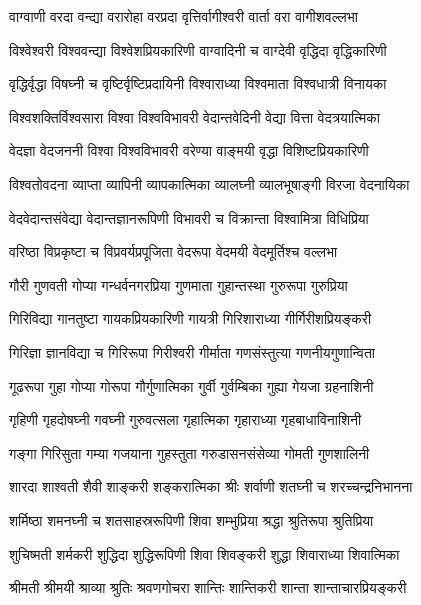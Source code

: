  \resetShloka


\twolineshloka
{वाग्वाणी वरदा वन्द्या वरारोहा वरप्रदा}
{वृत्तिर्वागीश्वरी वार्ता वरा वागीशवल्लभा}%

\twolineshloka
{विश्वेश्वरी विश्ववन्द्या विश्वेशप्रियकारिणी}
{वाग्वादिनी च वाग्देवी वृद्धिदा वृद्धिकारिणी}%

\twolineshloka
{वृद्धिर्वृद्धा विषघ्नी च वृष्टिर्वृष्टिप्रदायिनी}
{विश्वाराध्या विश्वमाता विश्वधात्री विनायका}%

\twolineshloka
{विश्वशक्तिर्विश्वसारा विश्वा विश्वविभावरी}
{वेदान्तवेदिनी वेद्या वित्ता वेदत्रयात्मिका}%

\twolineshloka
{वेदज्ञा वेदजननी विश्वा विश्वविभावरी}
{वरेण्या वाङ्मयी वृद्धा विशिष्टप्रियकारिणी}%

\twolineshloka
{विश्वतोवदना व्याप्ता व्यापिनी व्यापकात्मिका}
{व्यालघ्नी व्यालभूषाङ्गी विरजा वेदनायिका}%

\twolineshloka
{वेदवेदान्तसंवेद्या वेदान्तज्ञानरूपिणी}
{विभावरी च विक्रान्ता विश्वामित्रा विधिप्रिया}%

\twolineshloka
{वरिष्ठा विप्रकृष्टा च विप्रवर्यप्रपूजिता}
{वेदरूपा वेदमयी वेदमूर्तिश्च वल्लभा}%

\twolineshloka
{गौरी गुणवती गोप्या गन्धर्वनगरप्रिया}
{गुणमाता गुहान्तस्था गुरुरूपा गुरुप्रिया}%

\twolineshloka
{गिरिविद्या गानतुष्टा गायकप्रियकारिणी}
{गायत्री गिरिशाराध्या गीर्गिरीशप्रियङ्करी}%

\twolineshloka
{गिरिज्ञा ज्ञानविद्या च गिरिरूपा गिरीश्वरी}
{गीर्माता गणसंस्तुत्या गणनीयगुणान्विता}%

\twolineshloka
{गूढरूपा गुहा गोप्या गोरूपा गौर्गुणात्मिका}
{गुर्वी गुर्वम्बिका गुह्या गेयजा ग्रहनाशिनी}%

\twolineshloka
{गृहिणी गृहदोषघ्नी गवघ्नी गुरुवत्सला}
{गृहात्मिका गृहाराध्या गृहबाधाविनाशिनी}%

\twolineshloka
{गङ्गा गिरिसुता गम्या गजयाना गुहस्तुता}
{गरुडासनसंसेव्या गोमती गुणशालिनी}%

\twolineshloka
{शारदा शाश्वती शैवी शाङ्करी शङ्करात्मिका}
{श्रीः शर्वाणी शतघ्नी च शरच्चन्द्रनिभानना}%

\twolineshloka
{शर्मिष्ठा शमनघ्नी च शतसाहस्ररूपिणी}
{शिवा शम्भुप्रिया श्रद्धा श्रुतिरूपा श्रुतिप्रिया}%

\twolineshloka
{शुचिष्मती शर्मकरी शुद्धिदा शुद्धिरूपिणी}
{शिवा शिवङ्करी शुद्धा शिवाराध्या शिवात्मिका}%

\twolineshloka
{श्रीमती श्रीमयी श्राव्या श्रुतिः श्रवणगोचरा}
{शान्तिः शान्तिकरी शान्ता शान्ताचारप्रियङ्करी}%

